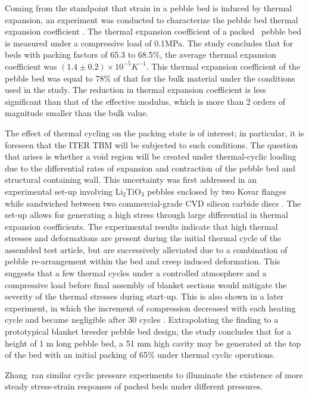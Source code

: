Coming from the standpoint that strain in a pebble bed is induced by thermal expansion, an experiment was conducted to characterize the pebble bed thermal expansion coefficient \cite{Tanigawa:2007fc}.  The thermal expansion coefficient of a packed \lit~pebble bed is measured under a compressive load of 0.1MPa.  The study concludes that for beds with packing factors of 65.3 to 68.5\%, the average thermal expansion coefficient was $(1.4\pm0.2)\times10^{-5}K^{-1}$. This thermal expansion coefficient of the pebble bed was equal to 78\% of that for the bulk material under the conditions used in the study. The reduction in thermal expansion coefficient is less significant than that of the effective modulus, which is more than 2 orders of magnitude smaller than the bulk value. 


The effect of thermal cycling on the packing state is of interest; in particular, it is foreseen that the ITER TBM will be subjected to such conditions. The question that arises is whether a void region will be created under thermal-cyclic loading due to the differential rates of expansion and contraction of the pebble bed and structural containing wall. This uncertainty was first addressed in an experimental set-up involving Li$_2$TiO$_3$ pebbles enclosed by two Kovar flanges while sandwiched between two commercial-grade CVD silicon carbide discs \cite{Calderoni:2006ye}. The set-up allows for generating a high stress through large differential in thermal expansion coefficients. The experimental results indicate that high thermal stresses and deformations are present during the initial thermal cycle of the assembled test article, but are successively alleviated due to a combination of pebble re-arrangement within the bed and creep induced deformation. This suggests that a few thermal cycles under a controlled atmosphere and a compressive load before final assembly of blanket sections would mitigate the severity of the thermal stresses during start-up. This is also shown in a later experiment, in which the increment of compression decreased with each heating cycle and became negligible after 30 cycles \cite{Tanigawa:2010cr}. Extrapolating the finding to a prototypical blanket breeder pebble bed design, the study concludes that for a height of 1 m long pebble bed, a 51 mm high cavity may be generated at the top of the bed with an initial packing of 65\% under thermal cyclic operations.  


Zhang\etal~ran similar cyclic pressure experiments to illuminate the existence of more steady stress-strain responses of packed beds under different pressures. 



